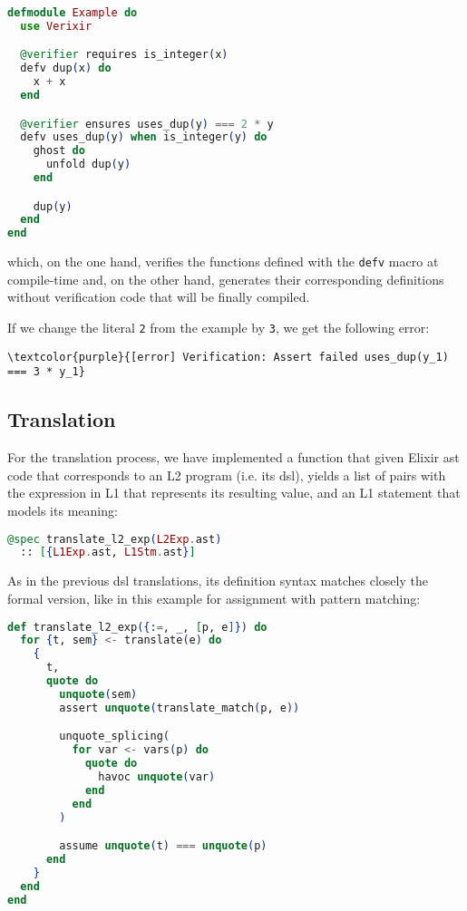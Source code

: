 \begin{lstlisting}[language=elixir,numbers=none,frame=none]
defmodule Example do
  use Verixir 

  @verifier requires is_integer(x)
  defv dup(x) do
    x + x
  end

  @verifier ensures uses_dup(y) === 2 * y
  defv uses_dup(y) when is_integer(y) do
    ghost do 
      unfold dup(y)
    end

    dup(y)
  end
end
\end{lstlisting}

which, on the one hand, verifies the functions defined with the \verb|defv|
macro at compile-time and, on the other hand, generates their corresponding
definitions without verification code that will be finally compiled.

If we change the literal \verb|2| from the example by \verb|3|, we get the
following error:

\begin{Verbatim}[commandchars=\\\{\}]
      \textcolor{purple}{[error] Verification: Assert failed uses_dup(y_1) === 3 * y_1}
\end{Verbatim}

\subsection{Translation}
For the translation process, we have implemented a function that given Elixir \gls{ast}
code that corresponds to an L2 program (i.e. its \gls{dsl}), yields a list of
pairs with the expression in L1 that represents its resulting value, and an L1
statement that models its meaning:

\begin{lstlisting}[language=elixir,numbers=none,frame=none]
@spec translate_l2_exp(L2Exp.ast) 
  :: [{L1Exp.ast, L1Stm.ast}]
\end{lstlisting}

As in the previous \gls{dsl} translations, its definition syntax matches closely
the formal version, like in this example for assignment with pattern matching:

\begin{lstlisting}[language=elixir,numbers=none,frame=none]
def translate_l2_exp({:=, _, [p, e]}) do
  for {t, sem} <- translate(e) do
    {
      t,
      quote do
        unquote(sem)
        assert unquote(translate_match(p, e))

        unquote_splicing(
          for var <- vars(p) do
            quote do
              havoc unquote(var)
            end
          end
        )

        assume unquote(t) === unquote(p)
      end
    }
  end
end
\end{lstlisting}

